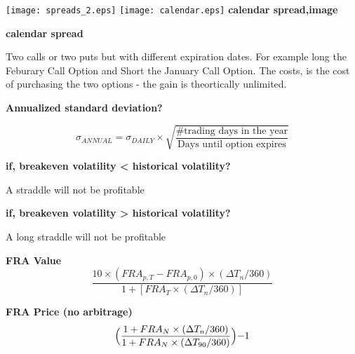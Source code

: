 \documentclass[12pt]{article}
\begin{document}
\texttt{[image: spreads\_2.eps]}
\texttt{[image: calendar.eps]}
\textbf{calendar spread,image}

\textbf{calendar spread}

Two calls or two puts but with different expiration dates. For example long the Feburary Call Option and Short the January Call Option. The costs, is the cost of purchasing the two options - the gain is theortically unlimited. 

\textbf{Annualized standard deviation?}

$$
\sigma_{ANNUAL} = \sigma_{DAILY} \times \sqrt{\dfrac{\text{\# trading days in the year}}{\text{Days until option expires}}}
$$

\textbf{if, breakeven volatility < historical volatility?}

A  straddle will not be profitable

\textbf{if, breakeven volatility > historical volatility?}

A long straddle will not be profitable

\textbf{FRA Value}\\

$$
\dfrac{10 \times (FRA_{p,T} - FRA_{p,0}) \times (\Delta T_n / 360)}{1 + [FRA_T \times (\Delta T_n / 360)]}
$$

\textbf{FRA Price (no arbitrage)}\\

$$
\Bigr( \dfrac{1 + FRA_N \times (\Delta T_n / 360) }{1 + FRA_N \times (\Delta T_{90} / 360) } \Bigl) - 1
$$
\end{document}
